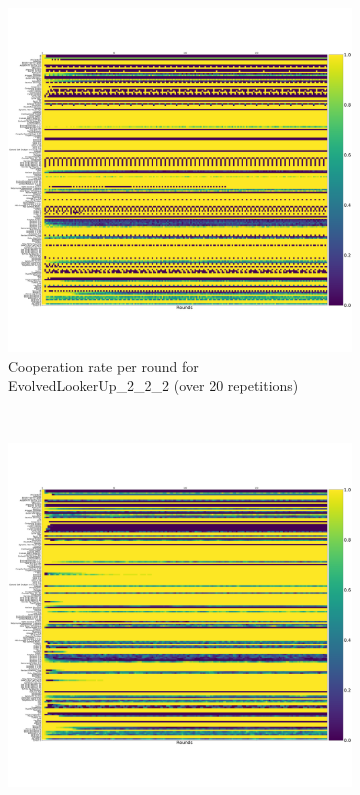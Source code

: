 \documentclass{article}
\begin{document}
\begin{figure}[!hbtp]
    \centering
    \begin{subfigure}[t]{.3\textwidth}
        \centering
        \includegraphics[width=\textwidth]{./assets/cooperation_0_0_20_EvolvedLookerUp2_2_2_array.pdf}
        \caption{Cooperation rate per round for EvolvedLookerUp\_2\_2\_2 (over
        20 repetitions)}
    \end{subfigure}%
    ~
    \begin{subfigure}[t]{.3\textwidth}
        \centering
        \includegraphics[width=\textwidth]{./assets/cooperation_0_0_20_Evolved_HMM_5_array.pdf}

\end{subfigure}
\end{figure}
\end{document}
